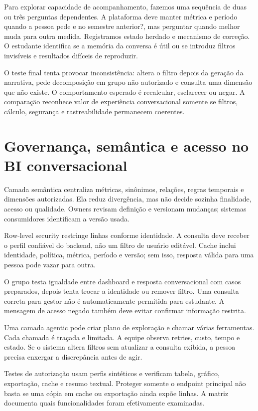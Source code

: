 Para explorar capacidade de acompanhamento, fazemos uma sequência de duas ou três perguntas dependentes. A plataforma deve manter métrica e período quando a pessoa pede e no semestre anterior?, mas perguntar quando melhor muda para outra medida. Registramos estado herdado e mecanismo de correção. O estudante identifica se a memória da conversa é útil ou se introduz filtros invisíveis e resultados difíceis de reproduzir.

O teste final tenta provocar inconsistência: altera o filtro depois da geração da narrativa, pede decomposição em grupo não autorizado e consulta uma dimensão que não existe. O comportamento esperado é recalcular, esclarecer ou negar. A comparação reconhece valor de experiência conversacional somente se filtros, cálculo, segurança e rastreabilidade permanecem coerentes.

\section{Governança, semântica e acesso no BI conversacional}

Camada semântica centraliza métricas, sinônimos, relações, regras temporais e dimensões autorizadas. Ela reduz divergência, mas não decide sozinha finalidade, acesso ou qualidade. Owners revisam definição e versionam mudanças; sistemas consumidores identificam a versão usada.

Row-level security restringe linhas conforme identidade. A consulta deve receber o perfil confiável do backend, não um filtro de usuário editável. Cache inclui identidade, política, métrica, período e versão; sem isso, resposta válida para uma pessoa pode vazar para outra.

O grupo testa igualdade entre dashboard e resposta conversacional com casos preparados, depois tenta trocar a identidade ou remover filtro. Uma consulta correta para gestor não é automaticamente permitida para estudante. A mensagem de acesso negado também deve evitar confirmar informação restrita.

Uma camada agentic pode criar plano de exploração e chamar várias ferramentas. Cada chamada é traçada e limitada. A equipe observa retries, custo, tempo e estado. Se o sistema altera filtros sem atualizar a consulta exibida, a pessoa precisa enxergar a discrepância antes de agir.

Testes de autorização usam perfis sintéticos e verificam tabela, gráfico, exportação, cache e resumo textual. Proteger somente o endpoint principal não basta se uma cópia em cache ou exportação ainda expõe linhas. A matriz documenta quais funcionalidades foram efetivamente examinadas.

